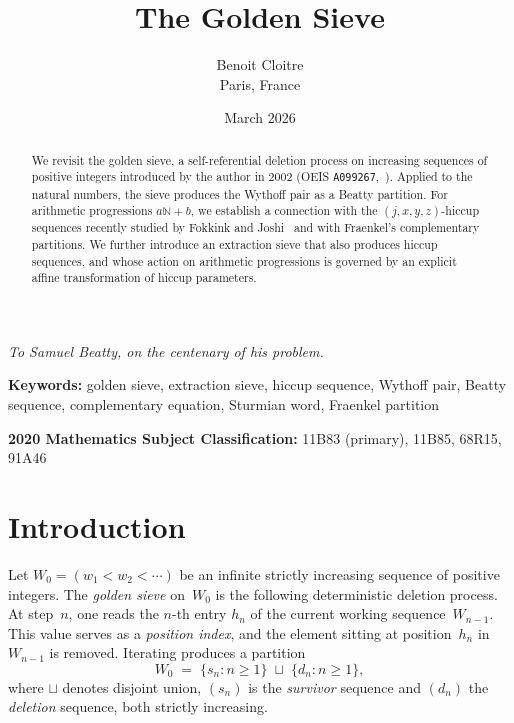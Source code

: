 \documentclass[11pt]{article}
\numberwithin{equation}{section}
\theoremstyle{plain}
\theoremstyle{definition}
\theoremstyle{remark}
\newcommand{\N}{\mathbb{N}}
\begin{document}
\title{The Golden Sieve}

\author{Benoit Cloitre\\
\small Paris, France}

\date{March 2026}

\maketitle

\vspace{0.5em}
{\centering\itshape To Samuel Beatty, on the centenary of his problem.\par}
\vspace{0.5em}

\begin{abstract}
We revisit the golden sieve, a self-referential deletion process on
increasing sequences of positive integers introduced by the author
in 2002 (OEIS \texttt{A099267},~\cite{OEIS}).  Applied to the natural numbers, the sieve
produces the Wythoff pair as a Beatty partition.  For arithmetic progressions $a\N+b$,
we establish a connection with the $(j,x,y,z)$-hiccup sequences
recently studied by Fokkink and Joshi~\cite{FJ2026} and with
Fraenkel's complementary partitions.  We further introduce an
extraction sieve that also produces hiccup sequences, and whose
action on arithmetic progressions is governed by an explicit affine
transformation of hiccup parameters.
\end{abstract}

\medskip\noindent\textbf{Keywords:}
golden sieve, extraction sieve, hiccup sequence, Wythoff pair, Beatty sequence,
complementary equation, Sturmian word, Fraenkel partition

\medskip\noindent\textbf{2020 Mathematics Subject Classification:}
11B83 (primary), 11B85, 68R15, 91A46

\section{Introduction}\label{sec:intro}

Let $W_0=(w_1<w_2<\cdots)$ be an infinite strictly increasing sequence of
positive integers.  The \emph{golden sieve} on~$W_0$ is the following
deterministic deletion process.  At step~$n$, one reads the $n$-th entry
$h_n$ of the current working sequence~$W_{n-1}$.  This value serves as a
\emph{position index}, and the element sitting at position~$h_n$
in~$W_{n-1}$ is removed.  Iterating produces a partition
\[
  W_0\;=\;\{s_n : n\ge1\}\;\sqcup\;\{d_n : n\ge1\},
\]
where $\sqcup$ denotes disjoint union, $(s_n)$ is the \emph{survivor}
sequence and $(d_n)$ the \emph{deletion} sequence, both strictly
increasing.
\end{document}
